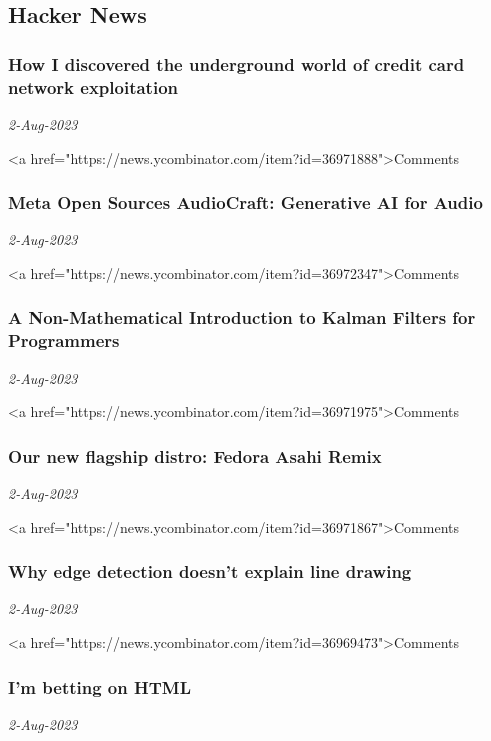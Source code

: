 \subsection{Hacker News \href{https://news.ycombinator.com/}{}}
\subsubsection{How I discovered the underground world of credit card network exploitation \href{https://chargebackstop.com/blog/card-networks-exploitation/}{}}
\textit{2-Aug-2023}

<a href="https://news.ycombinator.com/item?id=36971888">Comments
\subsubsection{Meta Open Sources AudioCraft: Generative AI for Audio \href{https://ai.meta.com/blog/audiocraft-musicgen-audiogen-encodec-generative-ai-audio/}{}}
\textit{2-Aug-2023}

<a href="https://news.ycombinator.com/item?id=36972347">Comments
\subsubsection{A Non-Mathematical Introduction to Kalman Filters for Programmers \href{https://praveshkoirala.com/2023/06/13/a-non-mathematical-introduction-to-kalman-filters-for-programmers/}{}}
\textit{2-Aug-2023}

<a href="https://news.ycombinator.com/item?id=36971975">Comments
\subsubsection{Our new flagship distro: Fedora Asahi Remix \href{https://asahilinux.org/2023/08/fedora-asahi-remix/}{}}
\textit{2-Aug-2023}

<a href="https://news.ycombinator.com/item?id=36971867">Comments
\subsubsection{Why edge detection doesn’t explain line drawing \href{https://aaronhertzmann.com/2020/04/19/lines-as-edges.html}{}}
\textit{2-Aug-2023}

<a href="https://news.ycombinator.com/item?id=36969473">Comments
\subsubsection{I'm betting on HTML \href{https://catskull.net/html.html}{}}
\textit{2-Aug-2023}

